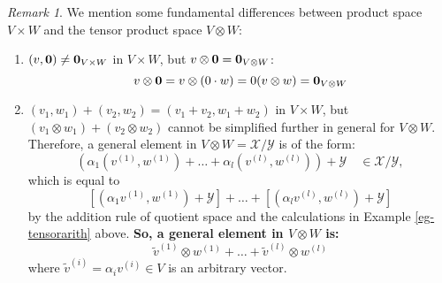 \documentclass[11pt,openany]{book}
\theoremstyle{plain}
\theoremstyle{definition}
\theoremstyle{remark}
\newtheorem{remark}[remark]{Remark}
\begin{document}
\begin{remark}
We mention some fundamental differences between product space $V \times W$ and the tensor product space $V \otimes W$:
\begin{enumerate}
    \item $(v,{\bf 0}) \neq {\bf 0}_{V\times W}$ in $V \times W$, but $v \otimes {\bf 0} = {\bf 0}_{V \otimes W}$:
    $$v \otimes {\bf 0} = v \otimes (0 \cdot w) = 0(v \otimes w) = {\bf 0}_{V \otimes W}$$
    \item  $(v_1,w_1) + (v_2,w_2) = (v_1 + v_2,w_1 + w_2)$ in $V \times W$,  but $(v_1 \otimes w_1) + (v_2 \otimes w_2)$ cannot be simplified further in  general for $V \otimes W$. Therefore, a general element in $V \otimes W = \mathcal{X}/\mathcal{Y}$ is of the form:
    $$(\alpha_1 (v^{(1)}, w^{(1)}) + \dots + \alpha_l (v^{(l)}, w^{(l)})) + \mathcal{Y} \quad \in \mathcal{X}/\mathcal{Y},$$
    which is equal to
    $$[(\alpha_1v^{(1)}, w^{(1)}) + \mathcal{Y}] + \dots + [(\alpha_lv^{(l)}, w^{(l)}) + \mathcal{Y}]$$
    by the addition rule of quotient space and the calculations in Example \ref{eg-tensorarith} above. {\bf So, a general element in $V \otimes W$ is:}
    $$\widetilde{v}^{(1)} \otimes w^{(1)} + \dots + \widetilde{v}^{(l)} \otimes w^{(l)}$$
    where $\widetilde{v}^{(i)} = \alpha_i v^{(i)} \in V$ is an arbitrary vector. 
\end{enumerate}
\end{remark}
\end{document}
